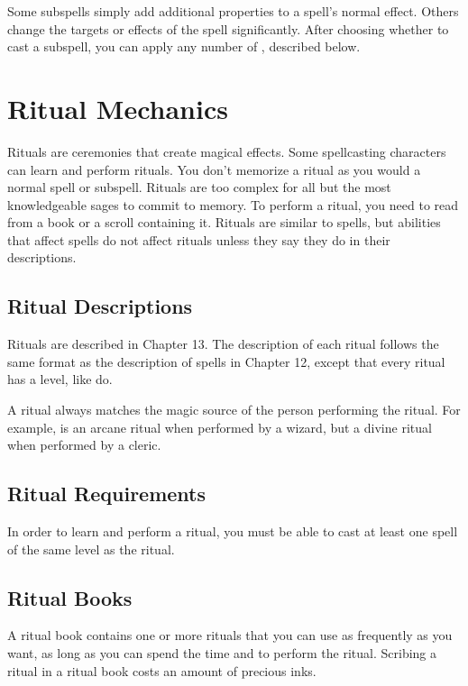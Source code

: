         Some subspells simply add additional properties to a spell's normal effect.
        Others change the targets or effects of the spell significantly.
        After choosing whether to cast a subspell, you can apply any number of , described below.

\section{Ritual Mechanics}
    Rituals are ceremonies that create magical effects.
    Some spellcasting characters can learn and perform rituals.
    You don't memorize a ritual as you would a normal spell or subspell.
    Rituals are too complex for all but the most knowledgeable sages to commit to memory.
    To perform a ritual, you need to read from a book or a scroll containing it.
    Rituals are similar to spells, but abilities that affect spells do not affect rituals unless they say they do in their descriptions.

    \subsection{Ritual Descriptions}
        Rituals are described in Chapter 13.
        The description of each ritual follows the same format as the description of spells in Chapter 12, except that every ritual has a level, like  do.

        A ritual always matches the magic source of the person performing the ritual.
        For example,  is an arcane ritual when performed by a wizard, but a divine ritual when performed by a cleric.
    \subsection{Ritual Requirements}
        In order to learn and perform a ritual, you must be able to cast at least one spell of the same level as the ritual.
    \subsection{Ritual Books}
        A ritual book contains one or more rituals that you can use as frequently as you want, as long as you can spend the time and  to perform the ritual.
        Scribing a ritual in a ritual book costs an amount of precious inks.
